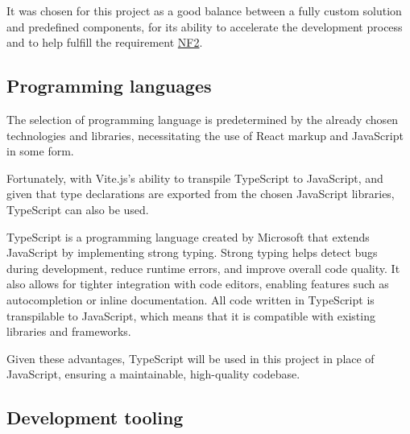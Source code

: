It was chosen for this project as a good balance between a fully custom solution and predefined components, for its ability to accelerate the development process and to help fulfill the requirement \hyperref[itm:NF2]{NF2}.

\subsection{Programming languages}

The selection of programming language is predetermined by the already chosen technologies and libraries, necessitating the use of React markup and JavaScript in some form.

Fortunately, with Vite.js's ability to transpile TypeScript to JavaScript, and given that type declarations are exported from the chosen JavaScript libraries, TypeScript can also be used. \cite{Said2023}

TypeScript is a programming language created by Microsoft that extends JavaScript by implementing strong typing. Strong typing helps detect bugs during development, reduce runtime errors, and improve overall code quality. It also allows for tighter integration with code editors, enabling features such as autocompletion or inline documentation. All code written in TypeScript is transpilable to JavaScript, which means that it is compatible with existing libraries and frameworks. \cite{TypeScript}

Given these advantages, TypeScript will be used in this project in place of JavaScript, ensuring a maintainable, high-quality codebase.

\subsection{Development tooling}
